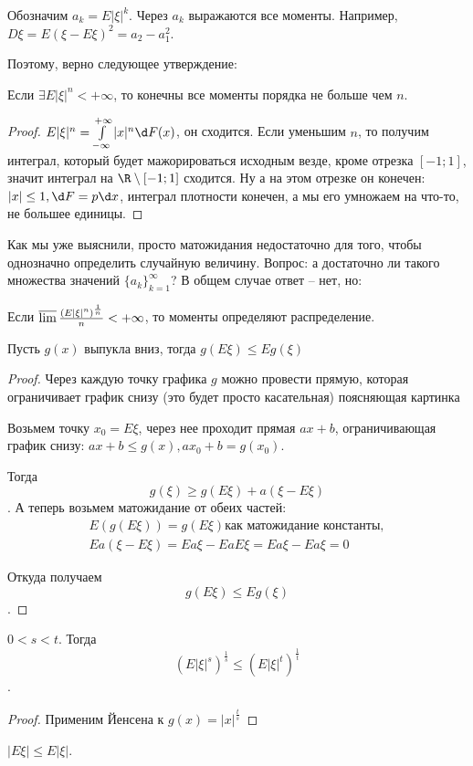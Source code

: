 Обозначим $a_k = E |\xi|^k$. 
Через $a_k$ выражаются все моменты. Например, $D\xi = E(\xi - E\xi)^2 = a_2 - a_1^2$.

Поэтому, верно следующее утверждение:
\begin{assertion}
Если $\exists E |\xi|^n < +\infty$, то конечны все моменты порядка не больше чем $n$.
\end{assertion}
\begin{proof}
$E |\xi|^n = \int\limits_{-\infty}^{+\infty} |x|^n \d F(x)$, он сходится. 
Если уменьшим $n$, то получим интеграл, который будет мажорироваться исходным везде, кроме отрезка $[-1; 1]$, значит интеграл на $\R \setminus [-1; 1]$ сходится.
Ну а на этом отрезке он конечен: $|x| \leq 1, \d F = p \d x$, интеграл плотности конечен, а мы его умножаем на что-то, не большее единицы.
\end{proof}

Как мы уже выяснили, просто матожидания недостаточно для того, чтобы однозначно определить случайную величину. 
Вопрос: а достаточно ли такого множества значений $\{a_k\}_{k=1}^\infty$?
В общем случае ответ -- нет, но:

\begin{theorem}
    Если $\varlimsup \frac{(E|\xi|^n)^\frac1n}{n} < +\infty$, то моменты определяют распределение.
\end{theorem}

\begin{theorem}

Пусть $g(x)$ выпукла вниз, тогда $g(E \xi) \leq E g(\xi)$
\end{theorem}
\begin{proof}
    Через каждую точку графика $g$ можно провести прямую, которая ограничивает график снизу (это будет просто касательная) \TODO поясняющая картинка \TODO
    
    Возьмем точку $x_0 = E \xi$, через нее проходит прямая $ax + b$, ограничивающая график снизу: $ax + b \leq g(x), ax_0 + b = g(x_0)$.

    Тогда $$g(\xi) \geq g(E\xi) + a(\xi - E\xi)$$. 
    А теперь возьмем матожидание от обеих частей: 
    \begin{gather*}
    E(g(E\xi)) = g(E\xi) \text{как матожидание константы},\\
    E a(\xi - E\xi) = E a\xi - E aE\xi = E a\xi - E a\xi = 0
    \end{gather*}
    
    Откуда получаем $$g(E \xi) \leq E g(\xi)$$.
\end{proof}
\begin{conseq}
    $0 < s < t$. Тогда $$(E |\xi|^s)^\frac1s \leq (E |\xi|^t)^\frac1t$$.
\end{conseq}
\begin{proof}
    Применим Йенсена к $g(x) = |x|^\frac{t}{s}$
\end{proof}
\begin{conseq}
$|E\xi| \leq E|\xi|$.
\end{conseq}


